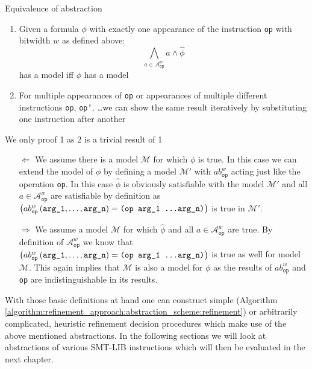 \begin{lemma} Equivalence of abstraction
\label{lemma:refinement_approach:abstraction_scheme:equivalence}
\begin{enumerate}
    \item \label{lemma:refinement_approach:abstraction_scheme:equivalence:1} Given a formula $\phi$ with exactly one appearance of the instruction \texttt{op} with bitwidth $w$ as defined above:
    \[
        \bigwedge\limits_{a\in\mathcal{A}_\texttt{op}^w} a \land \hat{\phi}
    \]
    has a model iff $\phi$ has a model
    \item For multiple appearances of \texttt{op} or appearances of multiple different instructions \texttt{op}, \texttt{op'}, \dots we can show the same result iteratively by substituting one instruction after another
\end{enumerate}
We only proof 1 as 2 is a trivial result of 1
\begin{itemize}
    \item[$\Leftarrow$]
    We assume there is a model $\mathcal{M}$ for which $\phi$ is true. In this case we can extend the model of $\phi$ by defining a model $\mathcal{M}'$ with $ab_\texttt{op}^w$ acting just like the operation \texttt{op}. In this case $\hat{\phi}$ is obviously satisfiable with the model $\mathcal{M}'$ and all $a \in \mathcal{A}_\texttt{op}^w$ are satisfiable by definition as $\left( ab_{\texttt{op}}^w\left(\texttt{arg\_1}, \dots, \texttt{arg\_n}\right)=\texttt{(op arg\_1 \dots arg\_n)} \right)$ is true in $\mathcal{M}'$.
    \item[$\Rightarrow$]
    We assume a model $\mathcal{M}$ for which $\hat{\phi}$ and all $a \in \mathcal{A}_\texttt{op}^w$ are true.
    By definition of $\mathcal{A}_\texttt{op}^w$ we know that $\left( ab_{\texttt{op}}^w\left(\texttt{arg\_1}, \dots, \texttt{arg\_n}\right)=\texttt{(op arg\_1 \dots arg\_n)} \right)$ is true as well for model $\mathcal{M}$.
    This again implies that $\mathcal{M}$ is also a model for $\phi$ as the results of $ab_\texttt{op}^w$ and \texttt{op} are indistinguishable in its results.
\end{itemize}
\end{lemma}

With those basic definitions at hand one can construct simple (Algorithm \ref{algorithm:refinement_approach:abstraction_scheme:refinement}) or arbitrarily complicated, heuristic  refinement decision procedures which make use of the above mentioned abstractions. In the following sections we will look at abstractions of various SMT-LIB instructions which will then be evaluated in the next chapter.


